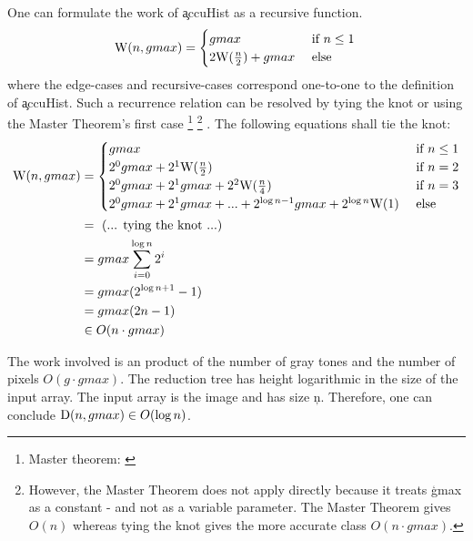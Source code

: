     One can formulate the work of \c{accuHist} as a recursive function.
    \begin{equation*}
    \textrm{W}(n,gmax) = \begin{cases}
                 gmax & \text{ if } n \le 1 \\ 
                 2 \textrm{W}(\frac{n}{2}) + gmax & \text{ else }
                \end{cases} \\
    \end{equation*}
    where the edge-cases and recursive-cases correspond one-to-one
    to the definition of \c{accuHist}.
    Such a recurrence relation can be resolved by tying the knot
    or using the Master Theorem's first case
    \footnote{Master theorem: \cite{MasterTheoremCormen2001}}
    \footnote{However, the Master Theorem does not apply directly
    because it treats \c{gmax} as a constant -
    and not as a variable parameter.
    The Master Theorem gives $O(n)$ whereas tying the knot
    gives the more accurate class $O(n \cdot gmax)$.}
    .
    The following equations shall tie the knot:
    \begin{equation*}
    \begin{split}
    \textrm{W}(n,gmax)
      & = \begin{cases}
            gmax & \text{ if } n \le 1 \\ 
            2^0gmax + 2^1\textrm{W}(\frac{n}{2}) & \text{ if } n = 2 \\
            2^0gmax + 2^1gmax + 2^2\textrm{W}(\frac{n}{4}) & \text{ if } n = 3 \\
            2^0gmax + 2^1gmax + ... + 2^{\log n - 1}gmax + 2^{\log n}\textrm{W}(1) & \text{ else }
          \end{cases} \\
      & = \textrm{ (... tying the knot ...) } \\
      & = gmax \sum_{i=0}^{\log n}{2^i} \\
      & = gmax (2^{\log n + 1} - 1) \\
      & = gmax (2n - 1) \\
      & \in O(n \cdot gmax) \\
    \end{split}
    \end{equation*}
    
    The work involved is an product of the number of gray tones and
    the number of pixels $O(g \cdot gmax)$.
    The reduction tree has height logarithmic
    in the size of the input array. The input array is the image and
    has size \c{n}. Therefore, one can conclude
    $\textrm{D}(n, gmax) \in O(\log n)$.
  
